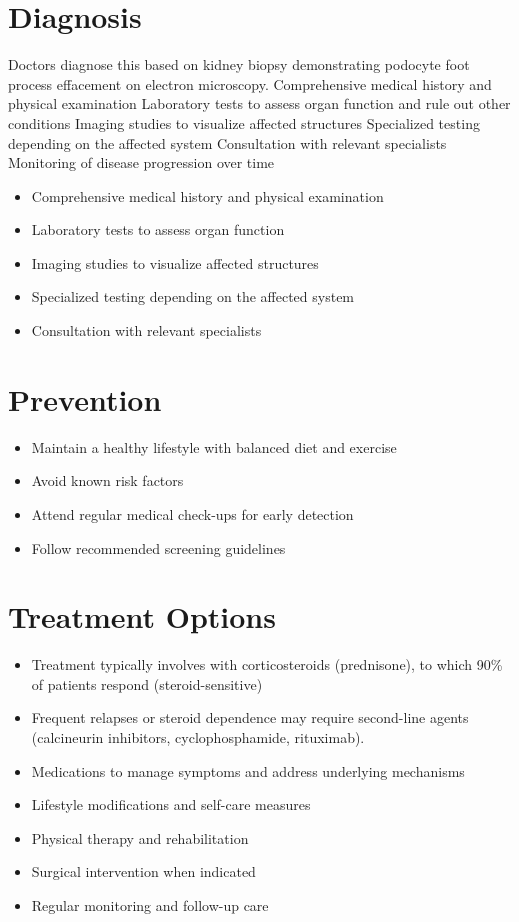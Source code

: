 \section{Diagnosis}
Doctors diagnose this based on kidney biopsy demonstrating podocyte foot process effacement on electron microscopy. Comprehensive medical history and physical examination Laboratory tests to assess organ function and rule out other conditions Imaging studies to visualize affected structures Specialized testing depending on the affected system Consultation with relevant specialists Monitoring of disease progression over time

\begin{itemize}[noitemsep]
  \item Comprehensive medical history and physical examination
  \item Laboratory tests to assess organ function
  \item Imaging studies to visualize affected structures
  \item Specialized testing depending on the affected system
  \item Consultation with relevant specialists
\end{itemize}
\section{Prevention}
\begin{itemize}[noitemsep]
  \item Maintain a healthy lifestyle with balanced diet and exercise
  \item Avoid known risk factors
  \item Attend regular medical check-ups for early detection
  \item Follow recommended screening guidelines
\end{itemize}
\section{Treatment Options}
\begin{itemize}[noitemsep]
  \item Treatment typically involves with corticosteroids (prednisone), to which 90\% of patients respond (steroid-sensitive)
  \item Frequent relapses or steroid dependence may require second-line agents (calcineurin inhibitors, cyclophosphamide, rituximab).
  \item Medications to manage symptoms and address underlying mechanisms
  \item Lifestyle modifications and self-care measures
  \item Physical therapy and rehabilitation
  \item Surgical intervention when indicated
  \item Regular monitoring and follow-up care
\end{itemize}
